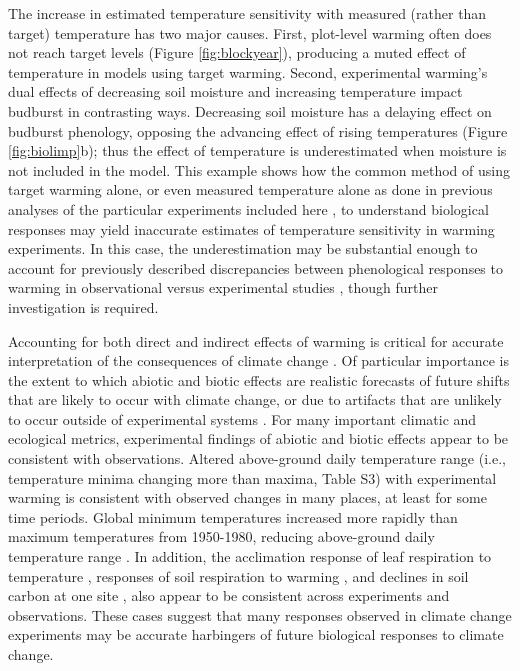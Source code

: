 \documentclass{article}
\begin{document}
\par The increase in estimated temperature sensitivity with measured (rather than target) temperature has two major causes. First, plot-level warming often does not reach target levels (Figure \ref{fig:blockyear}), producing a muted effect of temperature in models using target warming. Second, experimental warming's dual effects of decreasing soil moisture and increasing temperature impact budburst in contrasting ways. 
Decreasing soil moisture has a delaying effect on budburst phenology, opposing the advancing effect of rising temperatures (Figure \ref{fig:biolimp}b); thus the effect of temperature is underestimated when moisture is not included in the model. This example shows how the common method of using target warming alone, or even measured temperature alone as done in previous analyses of the particular experiments included here \citep[exp01, exp03, exp04, exp10,][]{clark2014a,clark2014b,polgar2014,marchin2015}, to understand biological responses may yield inaccurate estimates of temperature sensitivity in warming experiments. In this case, the underestimation may be substantial enough to account for previously described discrepancies between phenological responses to warming in observational versus experimental studies \citep{wolkovich2012,polgar2014}, though further investigation is required. 

\par Accounting for both direct and indirect effects of warming is critical for accurate interpretation of the consequences of climate change \citep{kharouba2015}. Of particular importance is the extent to which abiotic and biotic effects are realistic forecasts of future shifts that are likely to occur with climate change, or due to artifacts that are unlikely to occur outside of experimental systems \citep{hurlbert1984,moise2010,diamond2013}. For many important climatic and ecological metrics, experimental findings of abiotic and biotic effects appear to be consistent with observations. Altered above-ground daily temperature range (i.e., temperature minima changing more than maxima, Table S3) with experimental warming is consistent with observed changes in many places, at least for some time periods. Global minimum temperatures increased more rapidly than maximum temperatures from 1950-1980, reducing above-ground daily temperature range \citep[][]{thorne2016,vose2005}. In addition, the acclimation response of leaf respiration to temperature \citep{aspinwall2016,reich2016}, responses of soil respiration to warming \citep{carey2016}, and declines in soil carbon at one site \citep{harte2015}, also appear to be consistent across experiments and observations. These cases suggest that many responses observed in climate change experiments may be accurate harbingers of future biological responses to climate change. 
\end{document}
